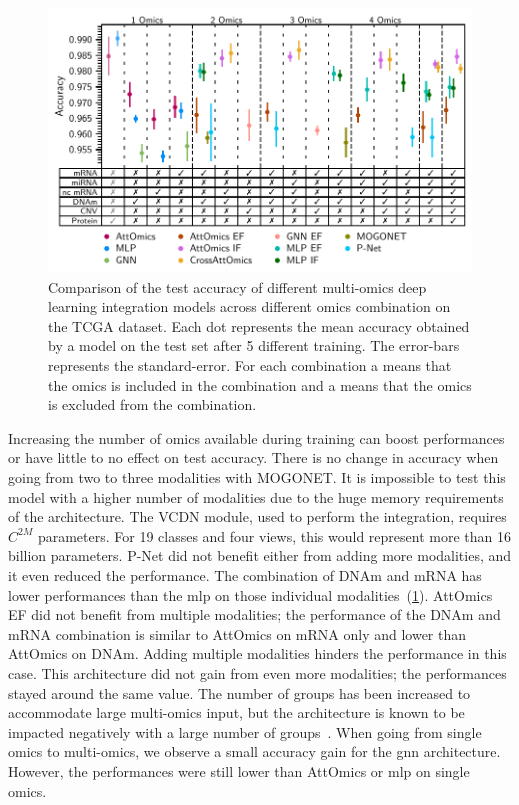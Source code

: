 \documentclass[../main.tex]{subfiles}
\begin{document}
	    \begin{figure}[htbp]
	        \centering
	        \includegraphics[width=1\textwidth]{tcga_perf_omics_comb.pdf}
	        \caption[Comparison of the test accuracy of different multi-omics deep learning integration models on TCGA data]{Comparison of the test accuracy of different multi-omics deep learning integration models across different omics combination on the TCGA dataset. Each dot represents the mean accuracy obtained by a model on the test set after 5 different training. The error-bars represents the standard-error. For each combination a \cmark means that the omics is included in the combination and a \xmark means that the omics is excluded from the combination.}
	        \label{fig:tcga_perf_comb}
	    \end{figure}

	    Increasing the number of omics available during training can boost performances or have little to no effect on test accuracy.
	    There is no change in accuracy when going from two to three modalities with MOGONET.
	    It is impossible to test this model with a higher number of modalities due to the huge memory requirements of the architecture.
	    The VCDN module, used to perform the integration, requires \(C^{2M}\) parameters.
	    For 19 classes and four views, this would represent more than 16 billion parameters.
	    P-Net did not benefit either from adding more modalities, and it even reduced the performance.
	    The combination of DNAm and mRNA has lower performances than the \gls{mlp} on those individual modalities~(\cref{fig:tcga_perf_comb}).
	    AttOmics EF did not benefit from multiple modalities; the performance of the DNAm and mRNA combination is similar to AttOmics on mRNA only and lower than AttOmics on DNAm.
	    Adding multiple modalities hinders the performance in this case.
	    This architecture did not gain from even more modalities; the performances stayed around the same value.
	    The number of groups has been increased to accommodate large multi-omics input, but the architecture is known to be impacted negatively with a large number of groups~\cite{AttOmics}.
	    When going from single omics to multi-omics, we observe a small accuracy gain for the \gls{gnn} architecture.
	    However, the performances were still lower than AttOmics or \gls{mlp} on single omics.
\end{document}
